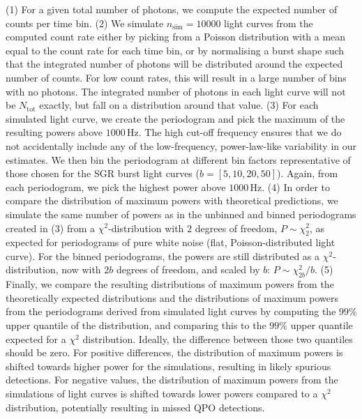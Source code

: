 \documentclass[numberedappendix]{emulateapj}
\newcommand{\hz}{\,\mathrm{Hz}}
\begin{document}
(1) For a given total number of photons, we compute the expected number of counts per time bin. 
(2) We simulate $n_{\mathrm{sim}} = 10000$ light curves from the computed count rate either by picking from a Poisson distribution with a mean equal to the count rate for each time bin, or by normalising a burst shape such that the integrated number of photons will be distributed around the expected number of counts. For low count rates, this will result in a large number of bins with no photons. The integrated number of photons in each light curve will not be $N_{\mathrm{tot}}$ exactly, but fall on a distribution around that value.
(3) For each simulated light curve, we create the periodogram and pick the maximum of the resulting powers above $1000 \hz$. The high cut-off frequency ensures that we do not accidentally include any of the low-frequency, power-law-like variability in our estimates. We then bin the periodogram at different bin factors representative of those chosen for the SGR burst light curves ($b = [5, 10, 20, 50]$). Again, from each periodogram, we pick the highest power above $1000 \hz$.
(4) In order to compare the distribution of maximum powers with theoretical predictions, we simulate the same number of powers as in the unbinned and binned periodograms created in (3) from a $\chi^2$-distribution with $2$ degrees of freedom, $P \sim \chi^2_2$, as expected for periodograms of pure white noise (flat, Poisson-distributed light curve). For the binned periodograms, the powers are still distributed as a $\chi^2$-distribution, now with $2b$ degrees of freedom, and scaled by $b$: $P \sim \chi^2_{2b}/b$.
(5) Finally, we compare the resulting distributions of maximum powers from the theoretically expected distributions and the distributions of maximum powers from the periodograms derived from simulated light curves by computing the $99\%$ upper quantile of the distribution, and comparing this to the $99\%$ upper quantile expected for a $\chi^2$ distribution. Ideally, the difference between those two quantiles should be zero. For positive differences, the distribution of maximum powers is shifted towards higher power for the simulations, resulting in likely spurious detections. For negative values, the distribution of maximum powers from the simulations of light curves is shifted towards lower powers compared to a $\chi^2$ distribution, potentially resulting in missed QPO detections.
\end{document}
